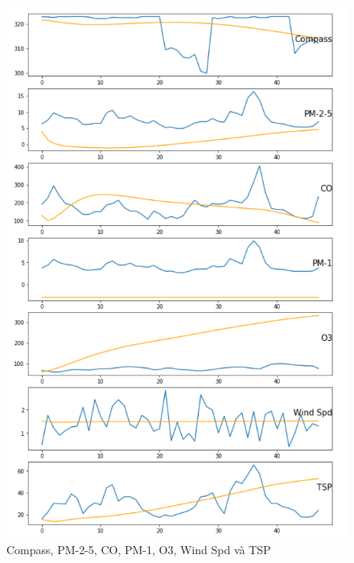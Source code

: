 \newpage
\begin{figure}[H]
    \centering
    \includegraphics[width=.95\textwidth]{figures/LSTM_test4.png}
    \caption[Compass, PM-2-5, CO, PM-1, O3, Wind Spd và TSP]{Compass, PM-2-5, CO, PM-1, O3, Wind Spd và TSP}
\end{figure}
\newpage
